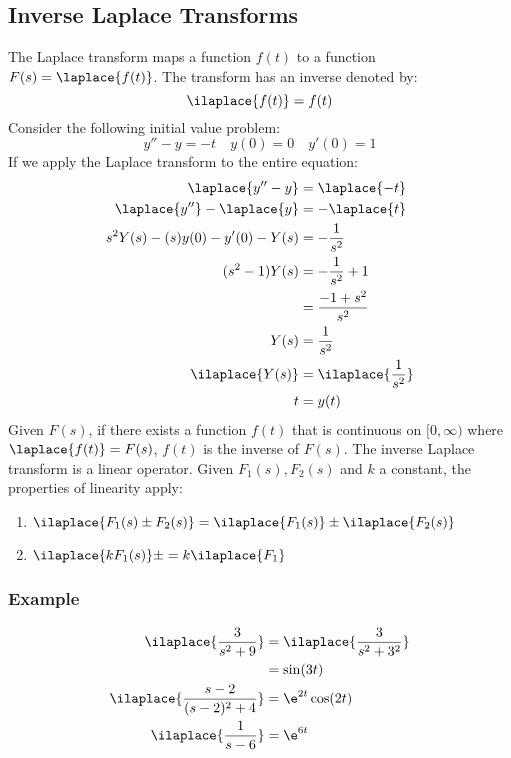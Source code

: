 \documentclass{math}
\begin{document}
\subsection*{Inverse Laplace Transforms}
The Laplace transform maps a function \( f(t) \) to a function \( F(s) =
\laplace{f(t)} \). The transform has an inverse denoted by:
\[ \ilaplace{f(t)} = f(t) \]
Consider the following initial value problem:
\[ y''-y = -t \quad y(0) = 0 \quad y'(0) = 1 \]
If we apply the Laplace transform to the entire equation:
\begin{align*}
  \laplace{y''-y} &= \laplace{-t} \\
  \laplace{y''}-\laplace{y} &= -\laplace{t} \\
  s^2Y(s)-(s)y(0)-y'(0)-Y(s) &= -\frac{1}{s^2} \\
  (s^2-1)Y(s) &= -\frac{1}{s^2}+1 \\
  &= \frac{-1+s^2}{s^2} \\
  Y(s) &= \frac{1}{s^2} \\
  \ilaplace{Y(s)} &= \ilaplace{\frac{1}{s^2}} \\
  t &= y(t)
\end{align*}
Given \( F(s) \), if there exists a function \( f(t) \) that is continuous on
\( [0,\infty) \) where \( \laplace{f(t)} = F(s) \), \( f(t) \) is the inverse
of \( F(s) \). The inverse Laplace transform is a linear operator. Given
\( F_1(s), F_2(s) \) and \( k \) a constant, the properties of linearity apply:
\begin{enumerate}
  \item \( \ilaplace{F_1(s)\pm F_2(s)} =
  \ilaplace{F_1(s)}\pm\ilaplace{F_2(s)} \)
  \item \( \ilaplace{kF_1(s)}\pm = k\ilaplace{F_1} \)
\end{enumerate}

\subsubsection*{Example}
\begin{align*}
  \ilaplace{\frac{3}{s^2+9}} &= \ilaplace{\frac{3}{s^2+3^2}} \\
  &= \sin(3t) \\
  \ilaplace{\frac{s-2}{(s-2)^2+4}} &= \e^{2t}\cos(2t) \\
  \ilaplace{\frac{1}{s-6}} &= \e^{6t}
\end{align*}
\end{document}
